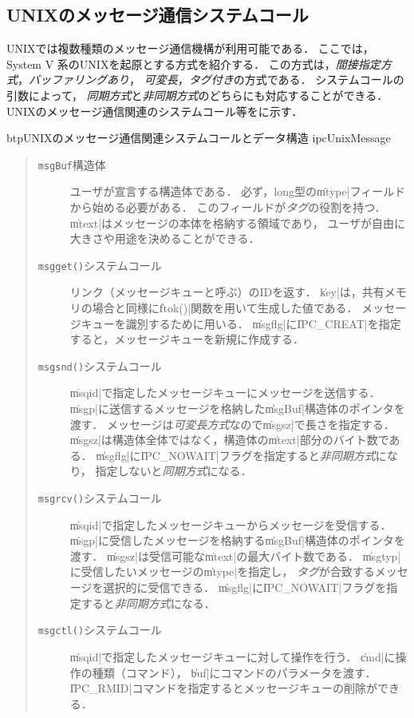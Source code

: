 \subsection{UNIXのメッセージ通信システムコール}
UNIXでは複数種類のメッセージ通信機構が利用可能である．
ここでは，System V 系のUNIXを起原とする方式を紹介する．
この方式は，\emph{間接指定方式}，\emph{バッファリングあり}，
\emph{可変長}，\emph{タグ付き}の方式である．
システムコールの引数によって，
\emph{同期方式}と\emph{非同期方式}のどちらにも対応することができる．
UNIXのメッセージ通信関連のシステムコール等をに示す．

\begin{myfig}{btp}{UNIXのメッセージ通信関連システムコールとデータ構造}
  {ipcUnixMessage}
  
\end{myfig}

\begin{quote}
  \begin{description}
  \item [\texttt{msgBuf}構造体]
    ユーザが宣言する構造体である．
    必ず，long型の\|mtype|フィールドから始める必要がある．
    このフィールドが\emph{タグ}の役割を持つ．
    \|mtext|はメッセージの本体を格納する領域であり，
    ユーザが自由に大きさや用途を決めることができる．
  \item [\texttt{msgget()}システムコール]
    リンク（メッセージキューと呼ぶ）のIDを返す．
    \|key|は，共有メモリの場合と同様に\|ftok()|関数を用いて生成した値である．
    メッセージキューを識別するために用いる．
    \|msgflg|に\|IPC_CREAT|を指定すると，メッセージキューを新規に作成する．
  \item [\texttt{msgsnd()}システムコール]
    \|msqid|で指定したメッセージキューにメッセージを送信する．
    \|msgp|に送信するメッセージを格納した\|msgBuf|構造体のポインタを渡す．
    メッセージは\emph{可変長方式}なので\|msgsz|で長さを指定する．
    \|msgsz|は構造体全体ではなく，構造体の\|mtext|部分のバイト数である．
    \|msgflg|に\|IPC_NOWAIT|フラグを指定すると\emph{非同期方式}になり，
    指定しないと\emph{同期方式}になる．
  \item [\texttt{msgrcv()}システムコール]
    \|msqid|で指定したメッセージキューからメッセージを受信する．
    \|msgp|に受信したメッセージを格納する\|msgBuf|構造体のポインタを渡す．
    \|msgsz|は受信可能な\|mtext|の最大バイト数である．
    \|msgtyp|に受信したいメッセージの\|mtype|を指定し，
    \emph{タグ}が合致するメッセージを選択的に受信できる．
    \|msgflg|に\|IPC_NOWAIT|フラグを指定すると\emph{非同期方式}になる．
  \item [\texttt{msgctl()}システムコール]
    \|msqid|で指定したメッセージキューに対して操作を行う．
    \|cmd|に操作の種類（コマンド），
    \|buf|にコマンドのパラメータを渡す．
    \|IPC_RMID|コマンドを指定するとメッセージキューの削除ができる．
  \end{description}
\end{quote}

